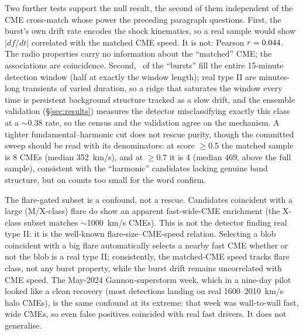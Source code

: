 \documentclass[twocolumn]{aastex631}
\begin{document}
Two further tests support the null result, the second of them independent of the CME
cross-match whose power the preceding paragraph questions. First, the burst's own drift rate encodes the shock
kinematics, so a real sample would show $|df/dt|$ correlated with the matched CME speed. It is not:
Pearson $r=0.044$. The radio properties carry no information about the ``matched''
CME; the associations are coincidence. Second, \tiiRealWindowSat\ of the ``bursts'' fill the
entire 15-minute detection window (half at exactly the window length); real type II are
minutes-long transients of varied duration, so a ridge that saturates the window every time is
persistent background structure tracked as a slow drift, and the ensemble validation
(\S\ref{sec:results}) measures the detector misclassifying exactly this class at a
$\sim$0.38 rate, so the census and the validation agree on the mechanism. A tighter
fundamental--harmonic cut does not rescue purity, though the committed sweep should be read
with its denominators: at score $\ge$0.5 the matched sample is 8 CMEs (median 352~km/s), and at
$\ge$0.7 it is 4 (median 469, above the full sample), consistent with the ``harmonic''
candidates lacking genuine band structure, but on counts too small for the word confirm.

The flare-gated subset is a confound, not a rescue. Candidates coincident with a large
(M/X-class) flare do show an apparent fast-wide-CME enrichment (the X-class subset matches
$\sim$1000~km/s CMEs). This is not the detector finding real type II: it is the well-known
flare-size--CME-speed relation. Selecting a blob coincident with a big flare automatically selects
a nearby fast CME whether or not the blob is a real type II; consistently, the matched-CME
speed tracks flare class, not any burst property, while the burst drift remains uncorrelated
with CME speed. The May-2024 Gannon-superstorm week, which in a nine-day pilot looked like a clean
recovery (most detections landing on real 1600--2010~km/s halo CMEs), is the same confound at its
extreme: that week was wall-to-wall fast, wide CMEs, so even false positives coincided with real
fast drivers. It does not generalise.
\end{document}
